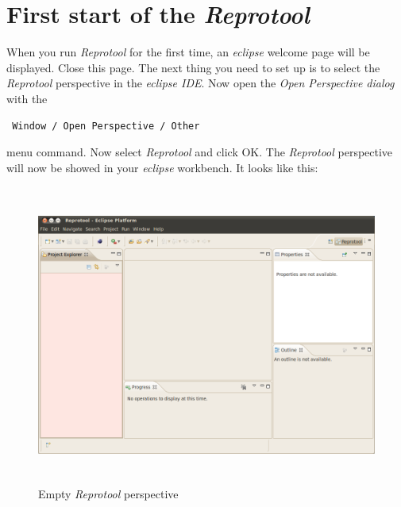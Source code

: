 \section{First start of the \emph{Reprotool}}
When you run \emph{Reprotool} for the first time, an \emph{eclipse} welcome page will be displayed. Close this page.
The next thing you need to set up is to select the \emph{Reprotool} perspective in the \emph{eclipse IDE}.
Now open the \emph{Open Perspective dialog} with the
\begin{verbatim}
 Window / Open Perspective / Other
\end{verbatim}
menu command. Now select \emph{Reprotool} and click OK. The \emph{Reprotool} perspective will now be showed in your \emph{eclipse}
workbench. It looks like this:

\begin{figure}[ht]
  \centering
  \includegraphics[height=280pt]{images/reprotoolPerspective}
  \caption{Empty \emph{Reprotool} perspective}
  \label{fig:reprotoolPerspective}
\end{figure}

